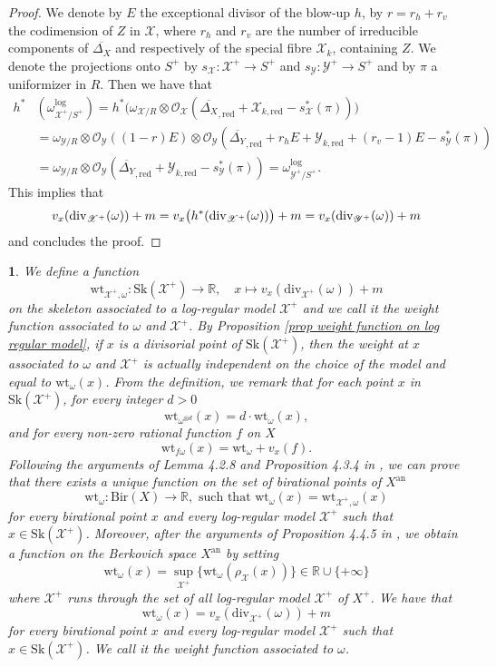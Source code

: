 \documentclass{amsart}%
\numberwithin{equation}{subsection}
\theoremstyle{plain2}
\theoremstyle{definition2}
\theoremstyle{stepstyle}
\theoremstyle{point}
\theoremstyle{subpoint}
\newtheorem{subpoint}[equation]{}%
\newcommand{\spa}[1]{\begin{subpoint}#1\end{subpoint}}           %
\newcommand{\R}{\ensuremath{\mathbb{R}}}
\newcommand{\cX}{\ensuremath{\mathscr{X}}}
\newcommand{\caO}{\ensuremath{\mathcal{O}}}
\newcommand{\cY}{\ensuremath{\mathscr{Y}}}
\renewcommand{\R}{\ensuremath{\mathbb{R}}}
\renewcommand{\cY}{\ensuremath{\mathscr{Y}}}
\newcommand{\redu}{\mathrm{red}}
\newcommand{\an}{\mathrm{an}}
\newcommand{\divisor}{\mathrm{div}}
\newcommand{\weight}{\mathrm{wt}}
\newcommand{\Sk}{\mathrm{Sk}}
\begin{document}
{\begin{proof}
We denote by $E$ the exceptional divisor of the blow-up $h$, by $r=r_h +r_v$ the codimension of $Z$ in $\cX$, where $r_h$ and $r_v$ are the number of irreducible components of $\overline{\Delta_X}$ and respectively of the special fibre $\cX_k$, containing $Z$. We denote the projections onto $S^+$ by $s_{\cX}:\cX^+\rightarrow S^+$ and $s_{\cY}:\cY^+ \rightarrow S^+$ and by $\pi$ a uniformizer in $R$. Then we have that
\begin{align*}
h^*&(\omega^{\log}_{\cX^+/S^+}) = h^* \big(\omega_{\cX/R} \otimes \caO_{\cX}(\overline{\Delta_X}_{,\redu} + \cX_{k,\redu} - s_\cX^*(\pi)) \big) \\
& = \omega_{\cY/R}\otimes \caO_{\cY}((1-r)E) \otimes \caO_{\cY}(\overline{\Delta_Y}_{,\redu} + r_hE+ \cY_{k,\redu} + (r_v-1)E - s_\cY^*(\pi))\\
& = \omega_{\cY/R} \otimes \caO_{\cY}(\overline{\Delta_Y}_{,\redu} + \cY_{k,\redu} - s_\cY^*(\pi)) = \omega^{\log}_{\cY^+/S^+}.
\end{align*} This implies that
$$v_x(\divisor_{\cX^+}(\omega)) +m = v_x\big(h^*(\divisor_{\cX^+}(\omega))\big) + m \\= v_x(\divisor_{\cY^+}(\omega)) +m$$ and concludes the proof.
\end{proof}
}

\spa{We define a function $$\weight_{\cX^+,\omega}: \Sk(\cX^+) \rightarrow \R, \quad x \mapsto v_x(\divisor_{\cX^+}(\omega)) +m$$ on the skeleton associated to a log-regular model $\cX^+$ and we call it the weight function associated to $\omega$ and $\cX^+$. By Proposition \ref{prop weight function on log regular model}, if $x$ is a divisorial point of $\Sk(\cX^+)$, then the weight at $x$ associated to $\omega$ and $\cX^+$ is actually independent on the choice of the model and equal to $\weight_{\omega}(x)$. From the definition, we remark that for each point $x$ in $\Sk(\cX^+)$, for every integer $d>0$ $$ \weight_{\omega^{\otimes d} }(x)= d \cdot \weight_{\omega}(x),$$ and for every non-zero rational function $f$ on $X$ $$ \weight_{f\omega}(x)= \weight_{\omega} + v_x(f).$$
Following the arguments of Lemma 4.2.8 and Proposition 4.3.4 in \cite{MustataNicaise}, we can prove that there exists a unique function on the set of birational points of $X^\an$ $$\weight_{\omega}: \text{Bir}(X) \rightarrow \R, \text{ such that }\weight_{\omega}(x)= \weight_{\cX^+,\omega}(x)$$ for every birational point $x$ and every log-regular model $\cX^+$ such that $x \in \Sk(\cX^+)$. Moreover, after the arguments of Proposition 4.4.5 in \cite{MustataNicaise}, we obtain a function on the Berkovich space $X^\an$ by setting $$\weight_{\omega}(x) = \sup_{\cX^+} \{ \weight_{\omega}(\rho_\cX (x))\} \in \R \cup \{+ \infty\}$$ where $\cX^+$ runs through the set of all log-regular model $\cX^+$ of $X^+$. We have that \begin{equation} \label{equ:weight function formula} \weight_{\omega}(x)=v_x(\divisor_{\cX^+}(\omega)) +m
\end{equation}for every birational point $x$ and every log-regular model $\cX^+$ such that $x \in \Sk(\cX^+)$. We call it the weight function associated to $\omega$.}
\end{document}
